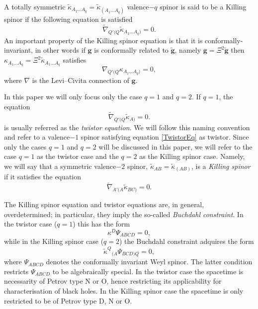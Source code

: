 \documentclass[10pt,a4paper]{article}
\theoremstyle{plain}
\def\bmg{{\bm g}}
\begin{document}
{\color{blue}
A totally symmetric
$\tilde{\kappa}_{A_1...A_q}=\tilde{\kappa}_{(A_1...A_q)}$ valence$-q$
spinor is said to be a Killing spinor if the following equation is
satisfied
\begin{equation}\label{qValenceKillingspinor}
\tilde{\nabla}_{Q'(Q}\tilde{\kappa}_{A_1...A_q)}=0.
\end{equation}
An important property of the Killing spinor equation is that it is
conformally-invariant, in other words if $\bmg$ is conformally related
to $\tilde{\bmg}$, namely $\bmg=\Xi^2\tilde{\bmg}$ then
${\kappa}_{A_1...A_q}=\Xi^2 \tilde{\kappa}_{A_1...A_q}$ satisfies
\[{\nabla}_{Q'(Q}{\kappa}_{A_1...A_q)}=0,\]
where ${\nabla}$ is the Levi--Civita connection of ${\bmg}$.

\medskip
\noindent In this paper we will only focus only the case $q=1$ and $q=2$.
If $q=1$, the equation
\begin{equation}\label{TwistorEq}
  \tilde{\nabla}_{Q'(Q}\tilde{\kappa}_{A)}=0.
\end{equation}
is usually referred as the \emph{twistor equation}. We will follow
this naming convention and refer to a valence$-1$ spinor
 satisfying equation \eqref{TwistorEq} as twistor.
Since only the cases $q=1$ and $q=2$ will be discussed in this paper, we will refer
to the case $q=1$ as the twistor case and the $q=2$ as the Killing
spinor case. Namely, we will say that a symmetric valence$-2$ spinor, $\tilde{\kappa}_{AB}=
\tilde{\kappa}_{(AB)}$, is a \textit{Killing spinor} if it satisfies
the equation
\begin{equation}
\tilde{\nabla}_{A'(A}\tilde{\kappa}_{BC)}=0.
\end{equation}

The Killing spinor equation and twistor equations are, in general, overdetermined;
in particular, they imply the so-called \textit{Buchdahl constraint}.
In the twistor case ($q=1$) this has the form
\[
\kappa^D\Psi_{ABCD}=0,
\]
while in the Killing spinor case ($q=2$) the Buchdahl constraint adquires the
form
\[
\tilde{\kappa}^Q{}_{(A}\Psi_{BCD)Q}=0,
\]
where $\Psi_{ABCD}$ denotes the conformally invariant Weyl spinor.
The latter condition restricts $\Psi_{ABCD}$ to be algebraically
special.  In the twistor case the spacetime is necessarity of Petrov
type N or O, hence restricting its applicability for characterisation of
black holes.  In the Killing spinor case the spacetime is only
restricted to be of Petrov type D, N or O.

}
\end{document}
